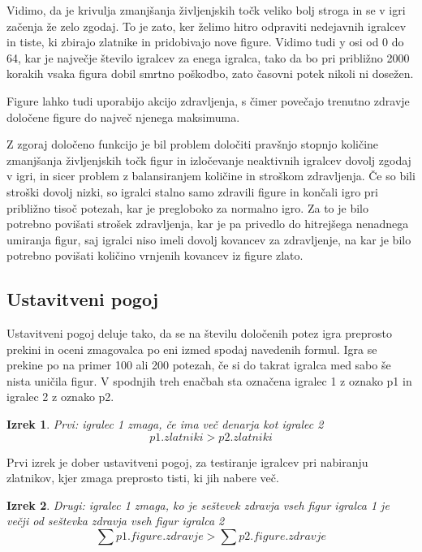 \documentclass[a4paper, 12pt]{book}
\newtheorem{izrek}{Izrek}[chapter]
\begin{document}
Vidimo, da je krivulja zmanjšanja življenjskih točk veliko bolj stroga in se v igri začenja že zelo zgodaj. 
To je zato, ker želimo hitro odpraviti nedejavnih igralcev in  tiste, ki zbirajo zlatnike in pridobivajo nove figure.
Vidimo tudi y osi od 0 do 64, kar je največje število igralcev za enega igralca, tako da bo pri približno 2000 korakih vsaka figura dobil smrtno poškodbo, zato časovni potek nikoli ni dosežen.

Figure lahko tudi uporabijo akcijo zdravljenja, s čimer povečajo trenutno zdravje določene figure do največ njenega maksimuma.
	
Z zgoraj določeno funkcijo je bil problem določiti pravšnjo stopnjo količine zmanjšanja življenjskih točk figur in izločevanje neaktivnih igralcev dovolj zgodaj v igri, in sicer problem z balansiranjem količine in stroškom zdravljenja. 
Če so bili stroški dovolj nizki, so igralci stalno samo zdravili figure in končali igro pri približno tisoč potezah, kar je pregloboko za normalno igro.
Za to je bilo potrebno povišati strošek zdravljenja, kar je pa privedlo do hitrejšega nenadnega umiranja figur, saj igralci niso imeli dovolj kovancev za zdravljenje, na kar je bilo potrebno povišati količino vrnjenih kovancev iz figure zlato.

\subsection{Ustavitveni pogoj}
Ustavitveni pogoj deluje tako, da se na številu določenih potez igra preprosto prekini in oceni zmagovalca po eni izmed spodaj navedenih formul.
Igra se prekine po na primer 100 ali 200 potezah, če si do takrat igralca med sabo še nista uničila figur.
V spodnjih treh  enačbah sta označena igralec 1 z oznako p1 in igralec 2 z oznako p2.

\begin{izrek}
	\label{ustavitvenipogoj1}
Prvi: igralec 1 zmaga, če ima več denarja kot igralec 2
	\begin{equation}
p1.zlatniki > p2.zlatniki
	\label{eq:ustavitvenipogoj1}
	\end{equation}
\end{izrek}

Prvi izrek je dober ustavitveni pogoj, za testiranje igralcev pri nabiranju zlatnikov, kjer zmaga preprosto tisti, ki jih nabere več.

\begin{izrek}
	\label{ustavitvenipogoj2}
Drugi: igralec 1 zmaga, ko je seštevek zdravja vseh figur igralca 1 je večji od seštevka zdravja vseh figur igralca 2
	\begin{equation}
	\sum{p1.figure.zdravje} > \sum{p2.figure.zdravje}
	\label{eq:ustavitvenipogoj2}
	\end{equation}
\end{izrek}
\end{document}
